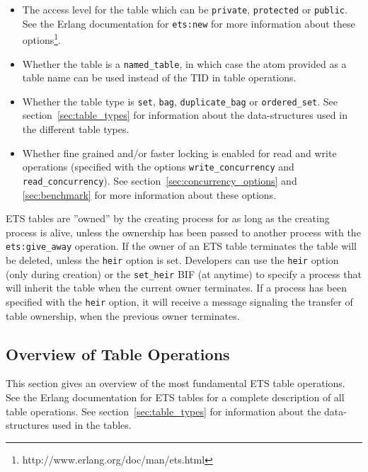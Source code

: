 \documentclass[aps,pre,preprint,nofootinbib]{revtex4}
\begin{document}
\begin{itemize}
\item 
  The access level for the table which can be \verb|private|, \verb|protected| or \verb|public|.
  See the Erlang documentation for \verb|ets:new| for more information about these options\footnote{http://www.erlang.org/doc/man/ets.html}.
\item
  Whether the table is a \verb|named_table|, in which case the atom provided as a table name can be used instead of the TID in table operations.
\item 
  Whether the table type is \verb|set|, \verb|bag|, \verb|duplicate_bag| or \verb|ordered_set|. 
  See section~\ref{sec:table_types} for information about the data-structures used in the different table types.
\item 
  Whether fine grained and/or faster locking is enabled for read and write operations (specified with the options \verb|write_concurrency| and \verb|read_concurrency|). 
  See section~\ref{sec:concurrency_options} and \ref{sec:benchmark} for more information about these options.
\end{itemize}

ETS tables are ''owned'' by the creating process for as long as the creating process is alive, unless the ownership has been passed to another process with the \verb|ets:give_away| operation.
If the owner of an ETS table terminates the table will be deleted, unless the \verb|heir| option is set.
Developers can use the \verb|heir| option (only during creation) or the \verb|set_heir| BIF (at anytime) to specify a process that will inherit the table when the current owner terminates. 
If a process has been specified with the \verb|heir| option, it will receive a message signaling the transfer of table ownership, when the previous owner terminates.

\subsection{Overview of Table Operations}

This section gives an overview of the most fundamental ETS table operations. 
See the Erlang documentation for ETS tables for a complete description of all table operations. 
See section~\ref{sec:table_types} for information about the data-structures used in the tables.
\end{document}
